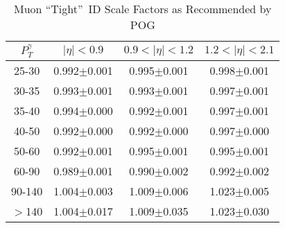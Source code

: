 \begin{table}[h]
  \footnotesize
  \begin{center}
  \caption{Muon ``Tight''~ID Scale Factors as Recommended by POG} 
   \begin{tabular}{|c|c|c|c|}
 $P_T^{\gamma}$  & $|\eta|< 0.9$   & $0.9<|\eta|< 1.2$    & $1.2<|\eta|< 2.1$ \\ \hline
25-30          & 0.992$\pm$0.001   & 0.995$\pm$0.001    & 0.998$\pm$0.001     \\ \hline
30-35          & 0.993$\pm$0.001   & 0.993$\pm$0.001    & 0.997$\pm$0.001        \\ \hline
35-40          & 0.994$\pm$0.000   & 0.992$\pm$0.001    & 0.997$\pm$0.001        \\ \hline
40-50          & 0.992$\pm$0.000   & 0.992$\pm$0.000    & 0.997$\pm$0.000        \\ \hline
50-60          & 0.992$\pm$0.001   & 0.995$\pm$0.001    & 0.995$\pm$0.001        \\ \hline
60-90          & 0.989$\pm$0.001   & 0.990$\pm$0.002    & 0.992$\pm$0.002        \\ \hline
90-140         & 1.004$\pm$0.003   & 1.009$\pm$0.006    & 1.023$\pm$0.005        \\ \hline
$>$140         & 1.004$\pm$0.017   & 1.009$\pm$0.035    & 1.023$\pm$0.030        \\ \hline
  \end{tabular}
  \label{tab:SFs_MuonID}
  \end{center}
\end{table}

